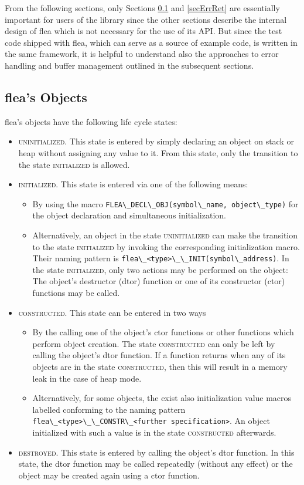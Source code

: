 \documentclass[a4paper,11pt]{scrartcl}
\newcommand{\stateUninit}{\textsc{uninitialized}\xspace}
\newcommand{\stateInit}{\textsc{initialized}\xspace}
\newcommand{\stateCreated}{\textsc{constructed}\xspace}
\newcommand{\stateDestroyed}{\textsc{destroyed}\xspace}
\begin{document}
From the following sections, only Sections \ref{secFleaObj} and \ref{secErrRet}
are essentially
important for users of the library since the other sections describe the
internal design of flea which is not necessary for the use of its API. But since
the test code shipped with flea, which can serve as a source of example code, is
written in the same framework, it is helpful to understand also the approaches
to error handling and buffer management outlined in the subsequent sections.
\subsection{flea's Objects}
\label{secFleaObj}
flea's objects have the following life cycle states:
\begin{itemize}
  \item \stateUninit. This state is entered by simply declaring an object on
    stack or heap without assigning any value to it. From this state, only the
    transition to the state \stateInit is allowed.
  \item \stateInit. This state is entered via one of the following means:
    \begin{itemize} 
        \item By using the macro
    \verb#FLEA\_DECL\_OBJ(symbol\_name, object\_type)# for the object declaration
    and simultaneous initialization. 
    \item Alternatively, an object in the state
    \stateUninit can make the transition to the state \stateInit by invoking the
    corresponding initialization macro.
    Their naming pattern is \verb#flea\_<type>\_\_INIT(symbol\_address)#.
    In the state \stateInit, only two
    actions may be performed on the object: The object's destructor (dtor)
    function or one of its constructor (ctor) functions may be called.
\end{itemize}
  \item \stateCreated. This state can be entered in two ways
    \begin{itemize}
    \item By the calling one of the object's
    ctor functions or other functions which perform object creation. The state
    \stateCreated can only be left by calling the object's dtor function. If a
    function returns when any of its objects are in the state \stateCreated,
    then this will result in a memory leak in the case of heap mode.
    \item Alternatively, for some objects, the exist also initialization value
      macros labelled conforming to the naming pattern
      \verb#flea\_<type>\_\_CONSTR\_<further specification>#. An object initialized
      with such a value is in the state \stateCreated afterwards.
  \end{itemize}
  \item \stateDestroyed. This state is entered by calling the object's dtor
    function. In this state, the dtor function may be called repeatedly (without
    any effect) or the object may be created again using a ctor function.
\end{itemize}
\end{document}
